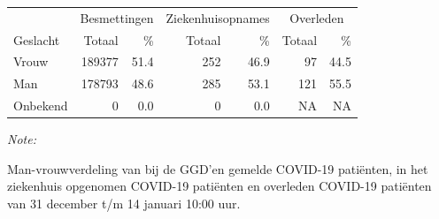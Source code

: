 \documentclass[
  english,
  man,floatsintext]{apa6}
\begin{document}
\begin{table}
\centering\begingroup\fontsize{11}{13}\selectfont

\begin{threeparttable}
\begin{tabular}{lrrrrrr}
\toprule
\multicolumn{1}{c}{ } & \multicolumn{2}{c}{Besmettingen} & \multicolumn{2}{c}{Ziekenhuisopnames} & \multicolumn{2}{c}{Overleden} \\
\cmidrule(l{3pt}r{3pt}){2-3} \cmidrule(l{3pt}r{3pt}){4-5} \cmidrule(l{3pt}r{3pt}){6-7}
Geslacht & Totaal & \% & Totaal & \% & Totaal & \%\\
\midrule
Vrouw & 189377 & 51.4 & 252 & 46.9 & 97 & 44.5\\
Man & 178793 & 48.6 & 285 & 53.1 & 121 & 55.5\\
Onbekend & 0 & 0.0 & 0 & 0.0 & NA & NA\\
\bottomrule
\end{tabular}
\begin{tablenotes}
\item \textit{Note: } 
\item Man-vrouwverdeling van bij de GGD’en gemelde COVID-19 patiënten, in het ziekenhuis opgenomen COVID-19 patiënten en overleden COVID-19 patiënten van 31 december t/m 14 januari 10:00 uur.
\end{tablenotes}
\end{threeparttable}
\endgroup{}
\end{table}
\newpage
\end{document}

